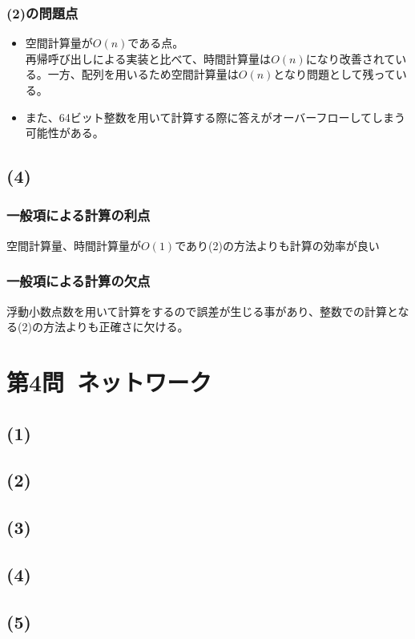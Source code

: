 \documentclass[a4paper,12pt,xelatex,ja=standard]{bxjsarticle}
\begin{document}
    \subsubsection*{(2)の問題点}
    \begin{itemize}
      \item 空間計算量が\(O(n)\)である点。\\
        再帰呼び出しによる実装と比べて、時間計算量は\(O(n)\)になり改善されている。一方、配列を用いるため空間計算量は\(O(n)\)となり問題として残っている。
      \item また、64ビット整数を用いて計算する際に答えがオーバーフローしてしまう可能性がある。
    \end{itemize}
  \subsection*{(4)}
    \subsubsection*{一般項による計算の利点}
    空間計算量、時間計算量が\(O(1)\)であり(2)の方法よりも計算の効率が良い
    \subsubsection*{一般項による計算の欠点}
    浮動小数点数を用いて計算をするので誤差が生じる事があり、整数での計算となる(2)の方法よりも正確さに欠ける。

\section*{第4問\ ネットワーク}
  \subsection*{(1)}
  \subsection*{(2)}
  \subsection*{(3)}
  \subsection*{(4)}
  \subsection*{(5)}
\end{document}
